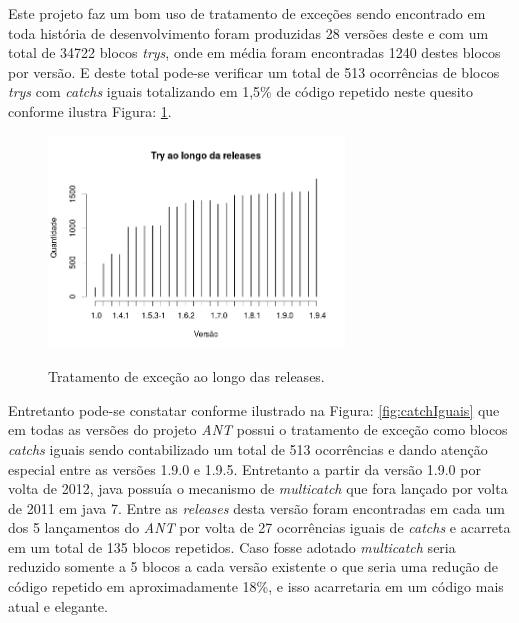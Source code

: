 Este projeto faz um bom uso de tratamento de exceções sendo encontrado em toda história de desenvolvimento foram produzidas 28 versões deste e com um total de 34722 blocos \textit{trys}, onde em média foram encontradas 1240 destes blocos por versão. E deste total pode-se verificar um total de 513 ocorrências de blocos \textit{trys} com \textit{catchs} iguais totalizando em 1,5\% de código repetido neste quesito conforme ilustra Figura: \ref{fig:TrysAnt}.\\

	\begin{figure}[h]
		\center
		\includegraphics[width=0.7\textwidth]{Imagens/trysAnt}
		\label{fig:TrysAnt}
		\caption{Tratamento de exceção ao longo das releases.}
	\end{figure}

Entretanto pode-se constatar conforme ilustrado na Figura: \ref{fig:catchIguais} que em todas as versões do projeto \textit{ANT} possui o tratamento de exceção como blocos \textit{catchs} iguais sendo contabilizado um total de 513 ocorrências e dando atenção especial entre as versões 1.9.0 e 1.9.5. Entretanto a partir da versão 1.9.0 por volta de 2012, java possuía o mecanismo de \textit{multicatch} que fora lançado por volta de 2011 em java 7. Entre as \textit{releases} desta versão foram encontradas em cada um dos 5 lançamentos do \textit{ANT} por volta de 27 ocorrências iguais de \textit{catchs} e acarreta em um total de 135 blocos repetidos. Caso fosse adotado \textit{multicatch} seria reduzido somente a 5 blocos a cada versão existente o que seria uma redução de código repetido em aproximadamente 18\%, e isso acarretaria em um código mais atual e elegante.\\

